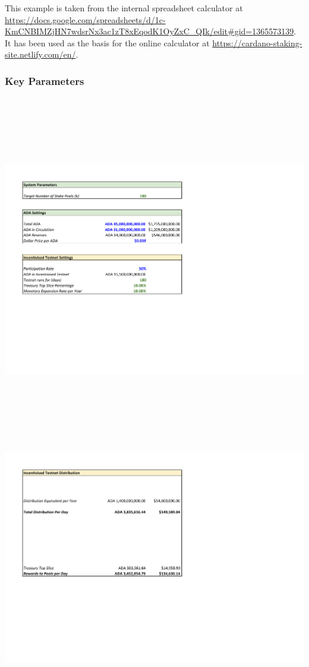 \documentclass[11pt,a4paper,dvipsnames,twosided,final]{article}
\begin{document}
\begin{minipage}{\textwidth}
  This example is taken from the internal \IOHK{} spreadsheet calculator at
\url{https://docs.google.com/spreadsheets/d/1c-KmCNBIMZjHN7wdsrNx3ac1zT8xEqodK1OyZxC_QIk/edit#gid=1365573139}.
It has been used as the basis for the online calculator at \url{https://cardano-staking-site.netlify.com/en/}.

\subsubsection*{Key Parameters}

\noindent
\vspace{-0.5in}
\includegraphics[height=6in]{RCT1.pdf}
\vspace{-2in}

\noindent
\includegraphics[width=1.2\textwidth]{RCT2.pdf}
\vspace{-1.9in}


\end{minipage}
\end{document}
